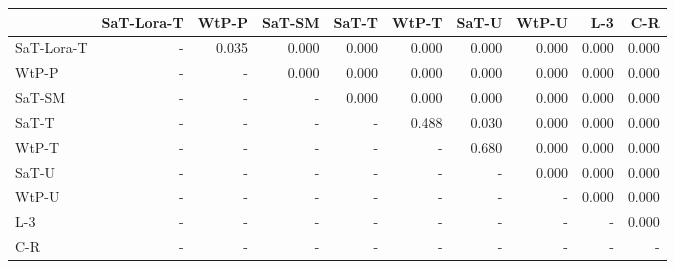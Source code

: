 \begin{tabular}{lrrrrrrrrr}
\toprule
 & SaT-Lora-T & WtP-P & SaT-SM & SaT-T & WtP-T & SaT-U & WtP-U & L-3 & C-R \\
\midrule
SaT-Lora-T & - & 0.035 & 0.000 & 0.000 & 0.000 & 0.000 & 0.000 & 0.000 & 0.000 \\
WtP-P & - & - & 0.000 & 0.000 & 0.000 & 0.000 & 0.000 & 0.000 & 0.000 \\
SaT-SM & - & - & - & 0.000 & 0.000 & 0.000 & 0.000 & 0.000 & 0.000 \\
SaT-T & - & - & - & - & 0.488 & 0.030 & 0.000 & 0.000 & 0.000 \\
WtP-T & - & - & - & - & - & 0.680 & 0.000 & 0.000 & 0.000 \\
SaT-U & - & - & - & - & - & - & 0.000 & 0.000 & 0.000 \\
WtP-U & - & - & - & - & - & - & - & 0.000 & 0.000 \\
L-3 & - & - & - & - & - & - & - & - & 0.000 \\
C-R & - & - & - & - & - & - & - & - & - \\
\bottomrule
\end{tabular}

